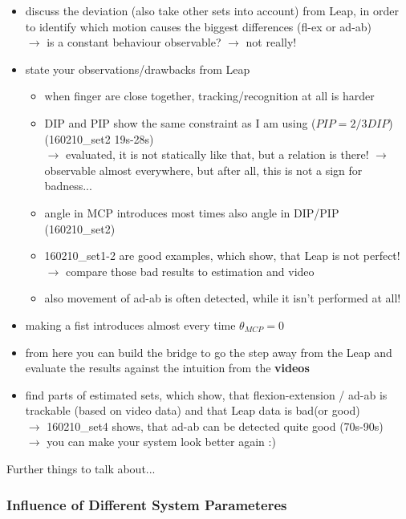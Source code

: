 	\begin{itemize}	
	\item discuss the deviation (also take other sets into account) from Leap, in order to identify which motion causes the biggest differences (fl-ex or ad-ab)\\
		$ \rightarrow $ is a constant behaviour observable? $ \rightarrow $ not really!
	\item state your observations/drawbacks from Leap 
		\begin{itemize}
		\item when finger are close together, tracking/recognition at all is harder
		\item DIP and PIP show the same constraint as I am using ($ PIP = 2/3 DIP $) (160210\_set2 19s-28s) \\
			$ \rightarrow $ evaluated, it is not statically like that, but a relation is there!
			$ \rightarrow $ observable almost everywhere, but after all, this is not a sign for badness...
			
		\item angle in MCP introduces most times also angle in DIP/PIP (160210\_set2) 			
		\item 160210\_set1-2 are good examples, which show, that Leap is not perfect!
			$ \rightarrow $	compare those bad results to estimation and video
		\item also movement of ad-ab is often detected, while it isn't performed at all!
		\end{itemize}
	\item making a fist introduces almost every time $ \theta_{MCP} = 0 $
				
	\item from here you can build the bridge to go the step away from the Leap and evaluate the results against the intuition from the \textbf{videos}
	\item find parts of estimated sets, which show, that flexion-extension / ad-ab is trackable (based on video data) and that Leap data is bad(or good) \\
		$ \rightarrow $ 160210\_set4 shows, that ad-ab can be detected quite good (70s-90s)	\\
		$ \rightarrow $	you can make your system look better again :)  
	\end{itemize}
	

	
	
Further things to talk about... \\
\subsubsection{Influence of Different System Parameteres}

